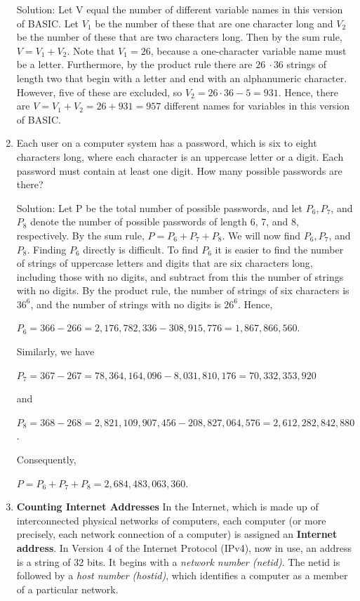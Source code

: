 \documentclass[11pt,a4paper]{book}
\begin{document}
\begin{enumerate}[label=Example~\arabic*]
Solution: Let V equal the number of different variable names in this version of BASIC.
Let $V_1$ be the number of these that are one character long and $V_2$ be the number of these that are two characters long.
Then by the sum rule, $V = V_1 + V_2$.
Note that $V_1 = 26$, because a one-character variable name must be a letter.
Furthermore, by the product rule there are $26 ~\cdot 36$ strings of length two that begin with a letter and end with an alphanumeric character.
However, five of these are excluded, so $V_2 = 26 \cdot 36 - 5 = 931$.
Hence, there are $V = V_1 + V_2 = 26 + 931 = 957$ different names for variables in this version of BASIC.

\item Each user on a computer system has a password, which is six to eight characters long, where each character is an uppercase letter or a digit.
Each password must contain at least one digit.
How many possible passwords are there?

Solution: Let P be the total number of possible passwords, and let $P_6, P_7$, and $P_8$ denote the number of possible passwords of length 6, 7, and 8, respectively.
By the sum rule, $P = P_6 + P_7 + P_8$.
We will now find $P_6, P_7$, and $P_8$.
Finding $P_6$ directly is difficult.
To find $P_6$ it is easier to find the number of strings of uppercase letters and digits that are six characters long, including those with no digits, and subtract from this the number of strings with no digits.
By the product rule, the number of strings of six characters is $36^{6}$, and the number of strings with no digits is $26^{6}$.
Hence, 

$P_6 = 366 - 266 = 2,176,782,336 - 308,915,776 = 1,867,866,560$.

Similarly, we have

$P_7 = 367 - 267 = 78,364,164,096 - 8,031,810,176 = 70,332,353,920$

and

$P_8 = 368 - 268 = 2,821,109,907,456 - 208,827,064,576 = 2,612,282,842,880$.

Consequently,

$P = P_6 + P_7 + P_8 = 2,684,483,063,360.$

\item \textbf{Counting Internet Addresses} In the Internet, which is made up of interconnected physical networks of computers, each computer (or more precisely, each network connection of a computer) is assigned an \textbf{Internet address}.
In Version 4 of the Internet Protocol (IPv4), now in use, an address is a string of 32 bits.
It begins with a \textit{network number (netid)}.
The netid is followed by a \textit{host number (hostid)}, which identifies a computer as a member of a particular network.


\end{enumerate}
\end{document}
